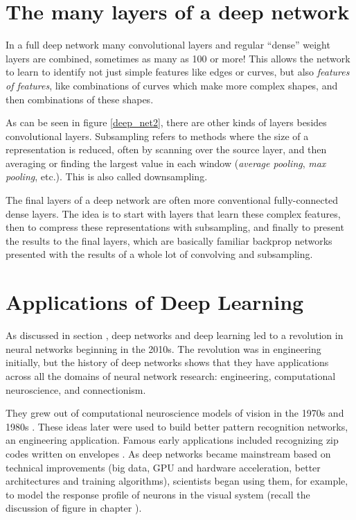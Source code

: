 \section{The many layers of a deep network}

In a full deep network many convolutional layers and regular ``dense'' weight layers are combined, sometimes as many as 100 or more! This allows the network to learn to identify not just simple features like edges or curves, but also \emph{features of features}, like combinations of curves which make more complex shapes, and then combinations of these shapes. 

As can be seen in figure \ref{deep_net2}, there are other kinds of layers besides convolutional layers. Subsampling refers to methods where the size of a representation is reduced, often by scanning over the source layer, and then averaging or finding the largest value in each window (\emph{average pooling}, \emph{max pooling}, etc.).  This is also called downsampling.  

The final layers of a deep network are often more conventional fully-connected dense layers. The idea is to start with layers that learn these complex features, then to compress these representations with subsampling, and finally to present the results to the final layers, which are basically familiar backprop networks presented with the results of a whole lot of convolving and subsampling.

\section{Applications of Deep Learning}

As discussed in section , deep networks and deep learning led to a revolution in neural networks beginning in the 2010s. The revolution was in engineering initially, but the history of deep networks shows that they have applications across all the domains of neural network research: engineering, computational neuroscience, and connectionism. 

They grew out of computational neuroscience models of vision in the 1970s and 1980s \cite{fukushima1982neocognitron}.  These ideas later were used to build better pattern recognition networks, an engineering application. Famous early applications included recognizing zip codes written on envelopes \cite{lecun1989backpropagation}. As deep networks became mainstream based on technical improvements (big data, GPU and hardware acceleration, better architectures and training algorithms), scientists began using them, for example, to model the response profile of neurons in the visual system (recall the discussion of figure  in chapter ). 

